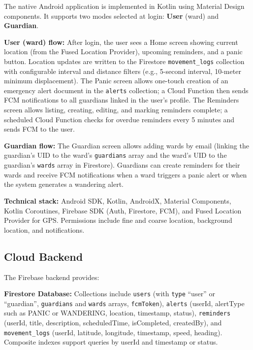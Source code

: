 \documentclass[conference]{IEEEtran}
\begin{document}
The native Android application is implemented in Kotlin using Material Design components. It supports two modes selected at login: \textbf{User} (ward) and \textbf{Guardian}.

\textbf{User (ward) flow:} After login, the user sees a Home screen showing current location (from the Fused Location Provider), upcoming reminders, and a panic button. Location updates are written to the Firestore \texttt{movement\_logs} collection with configurable interval and distance filters (e.g., 5-second interval, 10-meter minimum displacement). The Panic screen allows one-touch creation of an emergency alert document in the \texttt{alerts} collection; a Cloud Function then sends FCM notifications to all guardians linked in the user's profile. The Reminders screen allows listing, creating, editing, and marking reminders complete; a scheduled Cloud Function checks for overdue reminders every 5 minutes and sends FCM to the user.

\textbf{Guardian flow:} The Guardian screen allows adding wards by email (linking the guardian's UID to the ward's \texttt{guardians} array and the ward's UID to the guardian's \texttt{wards} array in Firestore). Guardians can create reminders for their wards and receive FCM notifications when a ward triggers a panic alert or when the system generates a wandering alert.

\textbf{Technical stack:} Android SDK, Kotlin, AndroidX, Material Components, Kotlin Coroutines, Firebase SDK (Auth, Firestore, FCM), and Fused Location Provider for GPS. Permissions include fine and coarse location, background location, and notifications.

\subsection{Cloud Backend}

The Firebase backend provides:

\textbf{Firestore Database:} Collections include \texttt{users} (with \texttt{type} ``user'' or ``guardian'', \texttt{guardians} and \texttt{wards} arrays, \texttt{fcmToken}), \texttt{alerts} (userId, alertType such as PANIC or WANDERING, location, timestamp, status), \texttt{reminders} (userId, title, description, scheduledTime, isCompleted, createdBy), and \texttt{movement\_logs} (userId, latitude, longitude, timestamp, speed, heading). Composite indexes support queries by userId and timestamp or status.
\end{document}
